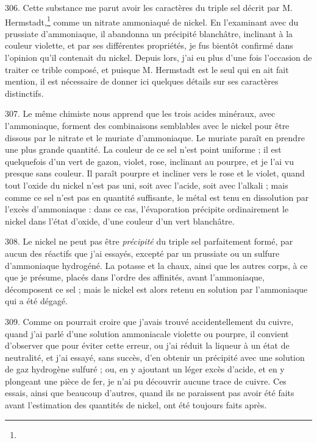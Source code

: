 \documentclass[a4paper, 11pt, oneside, polutonikogreek, french]{article}
\begin{document}
306. Cette substance me parut avoir les caractères du triple sel décrit par M. Hermstadt,\footnote{} comme un nitrate ammoniaqué de nickel. En l'examinant avec du prussiate d'ammoniaque, il abandonna un précipité blanchâtre, inclinant à la couleur violette, et par ses différentes propriétés, je fus bientôt confirmé dans l'opinion qu'il contenait du nickel. Depuis lors, j'ai eu plus d'une fois l'occasion de traiter ce trible composé, et puisque M. Hermstadt est le seul qui en ait fait mention, il est nécessaire de donner ici quelques détails sur ses caractères distinctifs.

307. Le même chimiste nous apprend que les trois acides minéraux, avec l'ammoniaque, forment des combinaisons semblables avec le nickel pour être dissous par le nitrate et le muriate d'ammoniaque. Le muriate paraît en prendre une plus grande quantité. La couleur de ce sel n'est point uniforme ; il est quelquefois d'un vert de gazon, violet, rose, inclinant au pourpre, et je l'ai vu presque sans couleur. Il paraît pourpre et incliner vers le rose et le violet, quand tout l'oxide du nickel n'est pas uni, soit avec l'acide, soit avec l'alkali ; mais comme ce sel n'est pas en quantité suffisante, le métal est tenu en dissolution par l'excès d'ammoniaque : dans ce cas, l'évaporation précipite ordinairement le nickel dans l'état d'oxide, d'une couleur d'un vert blanchâtre.

308. Le nickel ne peut pas être \emph{précipité} du triple sel parfaitement formé, par aucun des réactifs que j'ai essayés, excepté par un prussiate ou un sulfure d'ammoniaque hydrogéné. La potasse et la chaux, ainsi que les autres corps, à ce que je présume, placés dans l'ordre des affinités, avant l'ammoniaque, décomposent ce sel ; mais le nickel est alors retenu en solution par l'ammoniaque qui a été dégagé.

309. Comme on pourrait croire que j'avais trouvé accidentellement du cuivre, quand j'ai parlé d'une solution ammoniacale violette ou pourpre, il convient d'observer que pour éviter cette erreur, ou j'ai réduit la liqueur à un état de neutralité, et j'ai essayé, sans succès, d'en obtenir un précipité avec une solution de gaz hydrogène sulfuré ; ou, en y ajoutant un léger excès d'acide, et en y plongeant une pièce de fer, je n'ai pu découvrir aucune trace de cuivre. Ces essais, ainsi que beaucoup d'autres, quand ils ne paraissent pas avoir été faits avant l'estimation des quantités de nickel, ont été toujours faits après.
\end{document}
